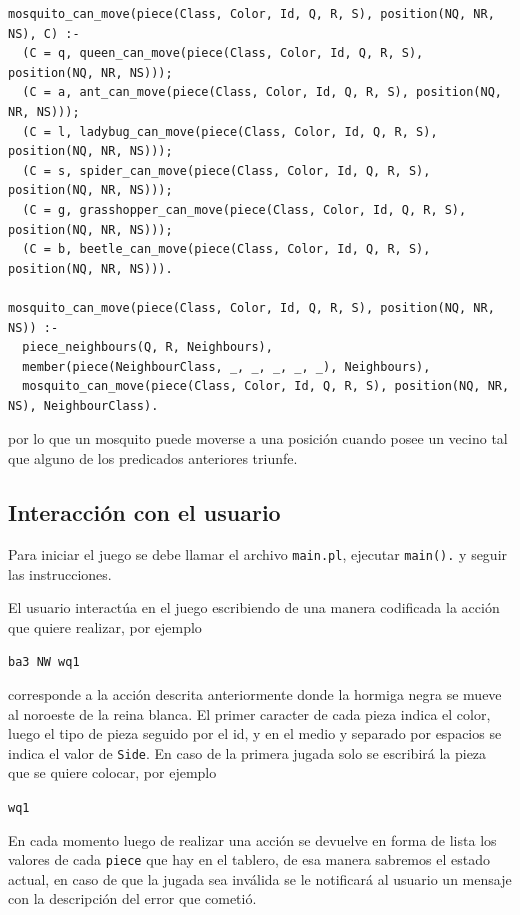 \documentclass[a4paper,11pt]{article}
\begin{document}
\begin{lstlisting}
mosquito_can_move(piece(Class, Color, Id, Q, R, S), position(NQ, NR, NS), C) :-
  (C = q, queen_can_move(piece(Class, Color, Id, Q, R, S), position(NQ, NR, NS)));
  (C = a, ant_can_move(piece(Class, Color, Id, Q, R, S), position(NQ, NR, NS)));
  (C = l, ladybug_can_move(piece(Class, Color, Id, Q, R, S), position(NQ, NR, NS)));
  (C = s, spider_can_move(piece(Class, Color, Id, Q, R, S), position(NQ, NR, NS)));
  (C = g, grasshopper_can_move(piece(Class, Color, Id, Q, R, S), position(NQ, NR, NS)));
  (C = b, beetle_can_move(piece(Class, Color, Id, Q, R, S), position(NQ, NR, NS))).

mosquito_can_move(piece(Class, Color, Id, Q, R, S), position(NQ, NR, NS)) :-
  piece_neighbours(Q, R, Neighbours),
  member(piece(NeighbourClass, _, _, _, _, _), Neighbours),
  mosquito_can_move(piece(Class, Color, Id, Q, R, S), position(NQ, NR, NS), NeighbourClass).
\end{lstlisting}

por lo que un mosquito puede moverse a una posici\'on cuando posee un vecino tal que alguno de los predicados anteriores triunfe.

\subsection{Interacci\'on con el usuario}

Para iniciar el juego se debe llamar el archivo \verb+main.pl+, ejecutar \verb+main().+ y seguir las instrucciones.

El usuario interact\'ua en el juego escribiendo de una manera codificada la acci\'on que quiere realizar, por ejemplo

\verb+ba3 NW wq1+

corresponde a la acci\'on descrita anteriormente donde la hormiga negra se mueve al noroeste de la reina blanca. El primer caracter de cada pieza indica el color, luego el tipo de pieza seguido por el id, y en el medio y separado por espacios se indica el valor de \verb+Side+. En caso de la primera jugada
solo se escribir\'a la pieza que se quiere colocar, por ejemplo

\verb+wq1+

En cada momento luego de realizar una acci\'on se devuelve en forma de lista los valores de cada \verb+piece+ que hay en el tablero, de esa manera sabremos el estado actual, en caso de que la jugada sea inv\'alida se le notificar\'a al usuario un mensaje con la descripci\'on del error que cometi\'o.
\end{document}
